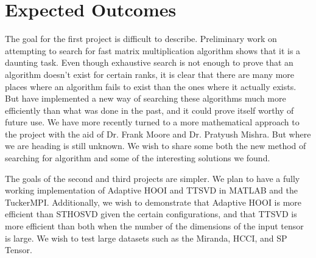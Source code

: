 \documentclass[MS]{wfuthesis}
\begin{document}
    \section{Expected Outcomes}
        The goal for the first project is difficult to describe. Preliminary work on attempting to search for fast matrix multiplication algorithm shows that it is a daunting task. Even though exhaustive search is not enough to prove that an algorithm doesn't exist for certain ranks, it is clear that there are many more places where an algorithm fails to exist than the ones where it actually exists. But have implemented a new way of searching these algorithms much more efficiently than what was done in the past, and it could prove itself worthy of future use. We have more recently turned to a more mathematical approach to the project with the aid of Dr. Frank Moore and Dr. Pratyush Mishra. But where we are heading is still unknown. We wish to share some both the new method of searching for algorithm and some of the interesting solutions we found.
        
        The goals of the second and third projects are simpler. We plan to have a fully working implementation of Adaptive HOOI and TTSVD in MATLAB and the TuckerMPI. Additionally, we wish to demonstrate that Adaptive HOOI is more efficient than STHOSVD given the certain configurations, and that TTSVD is more efficient than both when the number of the dimensions of the input tensor is large. We wish to test large datasets such as the Miranda, HCCI, and SP Tensor.

        

    \newpage
\end{document}
